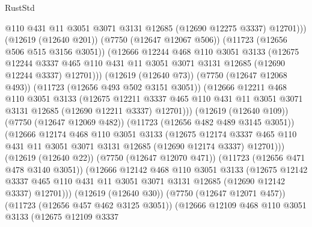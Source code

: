 \begin{lexlean}{RustStd}
\begin{coremodule}
                    @110
                    @431
                    @11
                    @3051
                    @3071
                    @3131
                    @12685
                    (@12690 @12275 @3337)
                    @12701)))
              (@12619 (@12640 @201))
              (@7750 (@12647 @12067 @506))
              (@11723 (@12656 @506 @515 @3156 @3051))
              (@12666
                @12244
                @468
                @110
                @3051
                @3133
                (@12675
                  @12244
                  @3337
                  @465
                  @110
                  @431
                  @11
                  @3051
                  @3071
                  @3131
                  @12685
                  (@12690 @12244 @3337)
                  @12701)))
            (@12619 (@12640 @73))
            (@7750 (@12647 @12068 @493))
            (@11723 (@12656 @493 @502 @3151 @3051))
            (@12666
              @12211
              @468
              @110
              @3051
              @3133
              (@12675
                @12211
                @3337
                @465
                @110
                @431
                @11
                @3051
                @3071
                @3131
                @12685
                (@12690 @12211 @3337)
                @12701)))
          (@12619 (@12640 @109))
          (@7750 (@12647 @12069 @482))
          (@11723 (@12656 @482 @489 @3145 @3051))
          (@12666
            @12174
            @468
            @110
            @3051
            @3133
            (@12675
              @12174
              @3337
              @465
              @110
              @431
              @11
              @3051
              @3071
              @3131
              @12685
              (@12690 @12174 @3337)
              @12701)))
        (@12619 (@12640 @22))
        (@7750 (@12647 @12070 @471))
        (@11723 (@12656 @471 @478 @3140 @3051))
        (@12666
          @12142
          @468
          @110
          @3051
          @3133
          (@12675
            @12142
            @3337
            @465
            @110
            @431
            @11
            @3051
            @3071
            @3131
            @12685
            (@12690 @12142 @3337)
            @12701)))
      (@12619 (@12640 @30))
      (@7750 (@12647 @12071 @457))
      (@11723 (@12656 @457 @462 @3125 @3051))
      (@12666
        @12109
        @468
        @110
        @3051
        @3133
        (@12675
          @12109
          @3337

\end{coremodule}
\end{lexlean}
